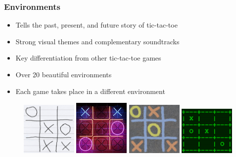 \documentclass{beamer}
\begin{document}
\begin{frame}
  \frametitle{Environments}

  \begin{itemize}
    \item Tells the past, present, and future story of tic-tac-toe
    \item Strong visual themes and complementary soundtracks
    \item Key differentiation from other tic-tac-toe games
    \item Over 20 beautiful environments
    \item Each game takes place in a different environment
  \end{itemize}

  \begin{figure}
    \vspace{1em}
    \includegraphics[width=0.24\textwidth]{img/concept-art/paper}
    \includegraphics[width=0.24\textwidth]{img/concept-art/neon}
    \includegraphics[width=0.24\textwidth]{img/concept-art/sidewalk}
    \includegraphics[width=0.24\textwidth]{img/concept-art/computer}
  \end{figure}

\end{frame}
\end{document}
